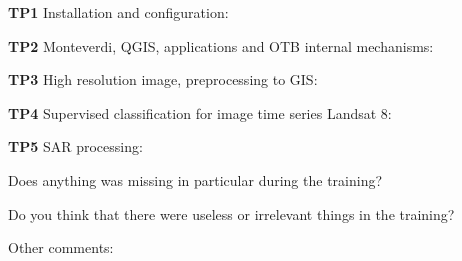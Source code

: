 \documentclass[10pt,a4paper]{article}
\begin{document}
\textbf{TP1} Installation and configuration:
\moduleanswer

\textbf{TP2} Monteverdi, QGIS, applications and OTB internal mechanisms:
\moduleanswer

\textbf{TP3} High resolution image, preprocessing to GIS:
\moduleanswer

\textbf{TP4} Supervised classification for image time series Landsat 8:
\moduleanswer

\textbf{TP5} SAR processing:
\moduleanswer

Does anything was missing in particular during the training?
\vspace{6em}

Do you think that there were useless or irrelevant things in the training? 
\vspace{6em}

Other comments:
\end{document}

